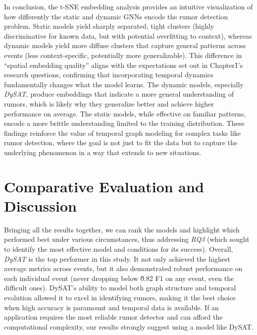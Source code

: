 \documentclass{cshonours}
\begin{document}
In conclusion, the t-SNE embedding analysis provides an intuitive visualization of how differently the static and dynamic GNNs encode the rumor detection problem. Static models yield sharply separated, tight clusters (highly discriminative for known data, but with potential overfitting to context), whereas dynamic models yield more diffuse clusters that capture general patterns across events (less context-specific, potentially more generalizable). This difference in “spatial embedding quality” aligns with the expectations set out in Chapter\~1’s research questions, confirming that incorporating temporal dynamics fundamentally changes what the model learns. The dynamic models, especially \emph{DySAT}, produce embeddings that indicate a more general understanding of rumors, which is likely why they generalize better and achieve higher performance on average. The static models, while effective on familiar patterns, encode a more brittle understanding limited to the training distribution. These findings reinforce the value of temporal graph modeling for complex tasks like rumor detection, where the goal is not just to fit the data but to capture the underlying phenomenon in a way that extends to new situations.

\section{Comparative Evaluation and Discussion}

Bringing all the results together, we can rank the models and highlight which performed best under various circumstances, thus addressing \emph{RQ3} (which sought to identify the most effective model and conditions for its success). Overall, \emph{DySAT} is the top performer in this study. It not only achieved the highest average metrics across events, but it also demonstrated robust performance on each individual event (never dropping below \~0.82 F1 on any event, even the difficult ones). DySAT’s ability to model both graph structure and temporal evolution allowed it to excel in identifying rumors, making it the best choice when high accuracy is paramount and temporal data is available. If an application requires the most reliable rumor detector and can afford the computational complexity, our results strongly suggest using a model like DySAT.
\end{document}
